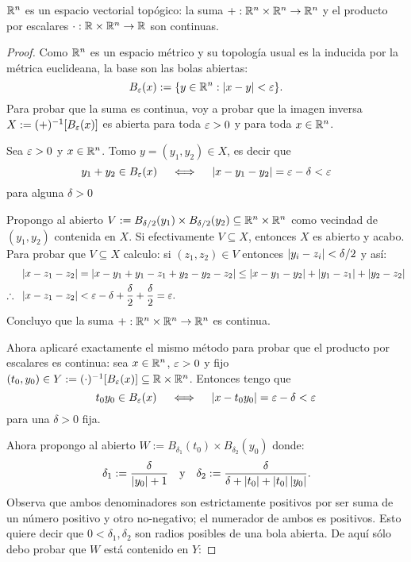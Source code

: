 
\begin{ejercicio}\label{ejercicio:3}
$\mathbb{R}^n$ es un espacio vectorial top\'ogico: la suma $+:\mathbb{R}^n\times\mathbb{R}^n\rightarrow \mathbb{R}^n$ y el producto por escalares
$\cdot:\mathbb{R}\times\mathbb{R}^n\rightarrow\mathbb{R}$ son continuas.
\end{ejercicio}
\begin{proof}%
Como $\mathbb{R}^n$ es un espacio m\'etrico y su topolog\'ia usual es la inducida por la m\'etrica euclideana,
la base son las bolas abiertas:
\[
	B_{\varepsilon}(x):=\{y\in\mathbb{R}^n : \left| x-y \right|<\varepsilon\}.
\]
Para probar que la suma es continua, voy a probar que la imagen inversa $X:=(+)^{-1}[B_{\varepsilon}(x)]$ es abierta
para toda $\varepsilon>0$ y para toda $x\in\mathbb{R}^n$.

Sea $\varepsilon>0$ y $x\in\mathbb{R}^n$. Tomo $y=(y_1,y_2)\in X$, es decir que
\[
	y_1+y_2\in B_{\varepsilon}(x) \quad\iff\quad \left| x-y_1-y_2 \right|=\varepsilon-\delta<\varepsilon
\]
para alguna $\delta>0$

Propongo al abierto $V:=B_{\delta/2}(y_1)\times B_{\delta/2}(y_2)\subseteq \mathbb{R}^n\times\mathbb{R}^n$ como
vecindad de $(y_1,y_2)$ contenida en $X$. Si efectivamente $V\subseteq X$, entonces $X$ es abierto y acabo.
Para probar que $V\subseteq X$ calculo: si $(z_1,z_2)\in V$ entonces $\left| y_i-z_i \right|<\delta/2$ y as\'i:
\begin{align*}
	\left| x-z_1-z_2 \right| & = \left| x-y_1+y_1-z_1+y_2-y_2-z_2 \right| \leq \left| x-y_1-y_2 \right| + \left| y_1-z_1 \right| + \left| y_2-z_2 \right| \\
	\therefore \;\; \left| x-z_1-z_2 \right|& <\varepsilon-\delta+\frac{\delta}{2}+\frac{\delta}{2} = \varepsilon.
\end{align*}
Concluyo que la suma $+:\mathbb{R}^n\times\mathbb{R}^n\rightarrow \mathbb{R}^n$ es continua.

Ahora aplicar\'e exactamente el mismo m\'etodo para probar que el producto por escalares es continua:
sea $x\in\mathbb{R}^n$, $\varepsilon>0$ y fijo $(t_0,y_0)\in Y:=(\cdot)^{-1}[B_{\varepsilon}(x)]\subseteq \mathbb{R}\times\mathbb{R}^n$. Entonces
tengo que
\[
	t_0 y_0\in B_{\varepsilon}(x) \quad\iff\quad \left| x-t_0y_0 \right|=\varepsilon-\delta <\varepsilon
\]
para una $\delta>0$ fija.

Ahora propongo al abierto $W:=B_{\delta_1}(t_0)\times B_{\delta_2}(y_0)$ donde:
\[
	\delta_1:=\frac{\delta}{\left| y_0 \right|+1} \quad\text{y}\quad
	\delta_2:=\frac{\delta}{\delta+\left| t_0 \right|+\left| t_0 \right|\left| y_0 \right|}.
\]
Observa que ambos denominadores son estrictamente positivos por ser suma de un n\'umero positivo y otro
no-negativo; el numerador de ambos es positivos. Esto quiere decir que $0<\delta_1,\delta_2$ son radios
posibles de una bola abierta. De aqu\'i s\'olo debo probar que $W$ est\'a contenido en $Y$:


\end{proof}
